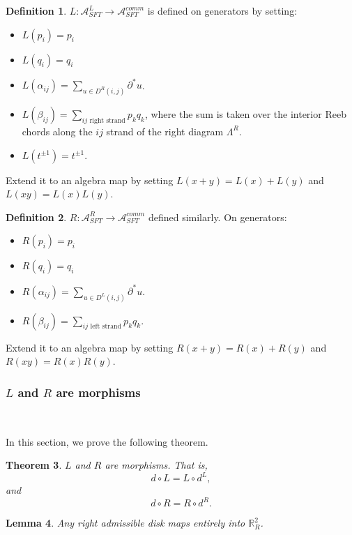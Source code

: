 \documentclass[a4paper,final, reqno]{amsart}
\theoremstyle{plain}
\newtheorem{Th}{Theorem}[section]
\newtheorem{Lemma}[Th]{Lemma}
\theoremstyle{definition}
\newtheorem{Def}[Th]{Definition}
\newcommand{\A}{\mathcal{A}}
\begin{document}
	\begin{Def}
		$L:\A^L_{SFT} \to \A^{comm}_{SFT}$ is defined on generators by setting:
		\begin{itemize}
			\item $L(p_i) = p_i$ 
			\item $L(q_i) = q_i$ 
			\item $L(\alpha_{ij}) = \sum_{u \in D^R(i,j)} \partial^*u$. 
			\item $L(\beta_{ij}) = \sum_{ij \text{ right strand}} p_kq_k$, where the sum is taken over the interior Reeb chords along the $ij$ strand of the right diagram $\Lambda^R$.
			\item $L(t^{\pm 1}) = t^{\pm 1}$.
		\end{itemize}
		
		Extend it to an algebra map by setting $L(x+y) = L(x)+L(y)$ and $L(xy) = L(x)L(y)$. 
	\end{Def}
	
	\begin{Def}
		$R:\A^R_{SFT} \to \A^{comm}_{SFT}$ defined similarly. On generators:
		\begin{itemize}
			\item $R(p_i) = p_i$
			\item $R(q_i) = q_i$
			\item $R(\alpha_{ij}) = \sum_{u \in D^L(i,j)} \partial^*u$. %
			\item $R(\beta_{ij}) = \sum_{ij \text{ left strand}} p_kq_k$.
		\end{itemize}
		
		Extend it to an algebra map by setting $R(x+y) = R(x)+R(y)$ and $R(xy) = R(x)R(y)$. 
	\end{Def}
	
	\subsubsection{$L$ and $R$ are morphisms}\-\
	
	In this section, we prove the following theorem.
	
	\begin{Th}\label{thm:LRmorphism}
		$L$ and $R$ are morphisms. That is, 
		\[ d \circ L = L \circ d^L, \]
		and
		\[ d\circ R = R \circ d^R.\]
	\end{Th}
	
	\begin{Lemma}\label{lem:rightdisk}
		Any right admissible disk maps entirely into $\mathbb{R}^2_R$.
	\end{Lemma}
	
\end{document}
